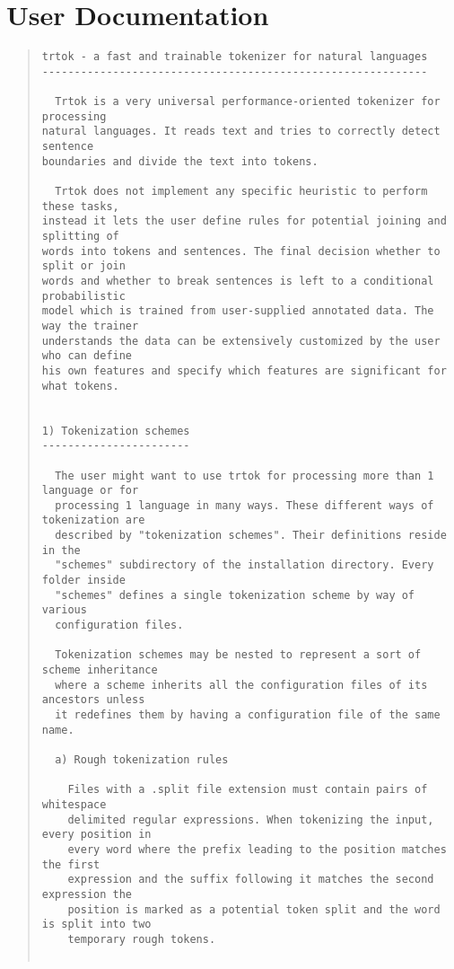 \chapter{User Documentation}

\begin{scriptsize}
\begin{quote}
\begin{verbatim}
trtok - a fast and trainable tokenizer for natural languages
------------------------------------------------------------

  Trtok is a very universal performance-oriented tokenizer for processing
natural languages. It reads text and tries to correctly detect sentence
boundaries and divide the text into tokens.

  Trtok does not implement any specific heuristic to perform these tasks,
instead it lets the user define rules for potential joining and splitting of
words into tokens and sentences. The final decision whether to split or join
words and whether to break sentences is left to a conditional probabilistic
model which is trained from user-supplied annotated data. The way the trainer
understands the data can be extensively customized by the user who can define
his own features and specify which features are significant for what tokens.


1) Tokenization schemes
-----------------------

  The user might want to use trtok for processing more than 1 language or for
  processing 1 language in many ways. These different ways of tokenization are
  described by "tokenization schemes". Their definitions reside in the
  "schemes" subdirectory of the installation directory. Every folder inside
  "schemes" defines a single tokenization scheme by way of various
  configuration files.

  Tokenization schemes may be nested to represent a sort of scheme inheritance
  where a scheme inherits all the configuration files of its ancestors unless
  it redefines them by having a configuration file of the same name.

  a) Rough tokenization rules

    Files with a .split file extension must contain pairs of whitespace
    delimited regular expressions. When tokenizing the input, every position in
    every word where the prefix leading to the position matches the first
    expression and the suffix following it matches the second expression the
    position is marked as a potential token split and the word is split into two
    temporary rough tokens. 


\end{verbatim}
\end{quote}
\end{scriptsize}

